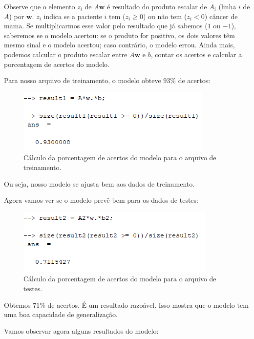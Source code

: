 \documentclass[11pt]{article}
\begin{document}
\begin{enumerate}
Observe que o elemento $z_i$ de $A\mathbf{w}$ é resultado do produto escalar de $A_i$ (linha $i$ de $A$) por $\mathbf{w}$. $z_i$ indica se a paciente $i$ tem ($z_i \ge 0$) ou não tem ($z_i < 0$) câncer de mama. Se multiplicarmos esse valor pelo resultado que já sabemos ($1$ ou $-1$), saberemos se o modelo acertou: se o produto for positivo, os dois valores têm mesmo sinal e o modelo acertou; caso contrário, o modelo errou. Ainda mais, podemos calcular o produto escalar entre $A\mathbf{w}$ e $b$, contar os acertos e calcular a porcentagem de acertos do modelo.

Para nosso arquivo de treinamento, o modelo obteve $93\%$ de acertos:

\begin{figure}[H]
    \centering
    \includegraphics[]{5-2}
    \caption{Cálculo da porcentagem de acertos do modelo para o arquivo de treinamento.}
\end{figure}

Ou seja, nosso modelo se ajusta bem aos dados de treinamento.

Agora vamos ver se o modelo prevê bem para os dados de testes:

\begin{figure}[H]
    \centering
    \includegraphics[]{5-3}
    \caption{Cálculo da porcentagem de acertos do modelo para o arquivo de testes.}
\end{figure}

Obtemos $71\%$ de acertos. É um resultado razoável. Isso mostra que o modelo tem uma boa capacidade de generalização.

Vamos observar agora alguns resultados do modelo:


\end{enumerate}
\end{document}
